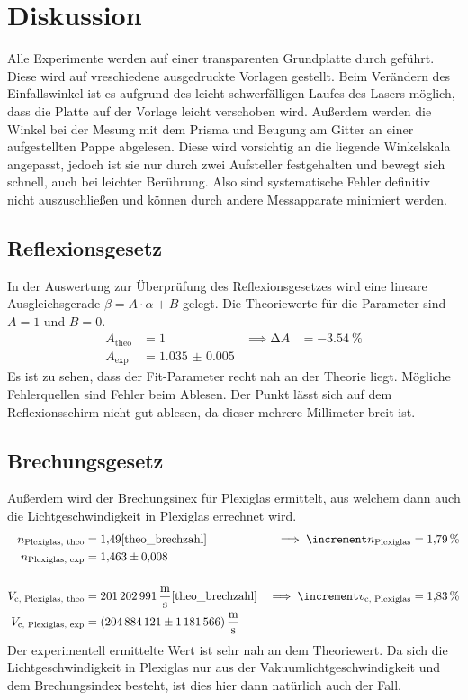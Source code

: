 \section{Diskussion}
\label{sec:Diskussion}

Alle Experimente werden auf einer transparenten Grundplatte durch geführt. Diese wird auf vreschiedene ausgedruckte Vorlagen gestellt. Beim Verändern des 
Einfallswinkel ist es aufgrund des leicht schwerfälligen Laufes des Lasers möglich, dass die Platte auf der Vorlage leicht verschoben wird. 
Außerdem werden die Winkel bei der Mesung mit dem Prisma und Beugung am Gitter an einer aufgestellten Pappe abgelesen. Diese wird vorsichtig an die liegende
Winkelskala angepasst, jedoch ist sie nur durch zwei Aufsteller festgehalten und bewegt sich schnell, auch bei leichter Berührung. 
Also sind systematische Fehler definitiv nicht auszuschließen und können durch andere Messapparate minimiert werden. 

\subsection{Reflexionsgesetz}

  In der Auswertung zur Überprüfung des Reflexionsgesetzes wird eine lineare Ausgleichsgerade $\beta = A \cdot \alpha + B$ gelegt. Die Theoriewerte für die 
  Parameter sind $A = 1$ und $B=0$. 
  \begin{align*}
    A_{\text{theo}} &= \num{1} & \implies \increment A &= \SI{-3.54}{\percent} \\
    A_{\text{exp}} &= \num{1.035(5)} 
  \end{align*}
  Es ist zu sehen, dass der Fit-Parameter recht nah an der Theorie liegt. Mögliche Fehlerquellen sind Fehler beim Ablesen. Der Punkt lässt sich auf dem Reflexionsschirm 
  nicht gut ablesen, da dieser mehrere Millimeter breit ist. 

\subsection{Brechungsgesetz} 

  Außerdem wird der Brechungsinex für Plexiglas ermittelt, aus welchem dann auch die Lichtgeschwindigkeit in Plexiglas errechnet wird. 
  \begin{align*}
    n_{\text{Plexiglas, theo}} &= \num{1.49}  \text{\cite{theo_brechzahl}} & \implies \increment n_{\text{Plexiglas}} &= \SI{1.79}{\percent}\\
    n_{\text{Plexiglas, exp}} &= \num{1.463(8)}\\
    \\
    V_{\text{c, Plexiglas, theo}} &= \SI{201202991}{\metre\per\second} \text{\cite{theo_brechzahl}} & \implies \increment v_{\text{c, Plexiglas}} &= \SI{1.83}{\percent}\\
    V_{\text{c, Plexiglas, exp}} &= \SI{204884121(1181566)}{\metre\per\second} 
  \end{align*}
  Der experimentell ermittelte Wert ist sehr nah an dem Theoriewert. Da sich die Lichtgeschwindigkeit in Plexiglas nur aus der Vakuumlichtgeschwindigkeit und 
  dem Brechungsindex besteht, ist dies hier dann natürlich auch der Fall. 

